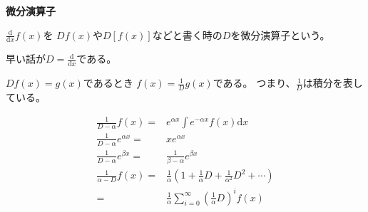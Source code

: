 \documentclass[12pt,b5paper]{ltjsarticle}
\begin{document}
\hrulefill

\textbf{微分演算子}

$\frac{\mathrm{d}}{\mathrm{d}x}f(x)$を
$Df(x)$や$D[f(x)]$などと書く時の$D$を微分演算子という。

早い話が$D = \frac{\mathrm{d}}{\mathrm{d}x}$である。

$Df(x)=g(x)$であるとき
$f(x)=\frac{1}{D}g(x)$である。
つまり、$\frac{1}{D}$は積分を表している。


\begin{align}
 \frac{1}{D-\alpha}f(x) =& e^{\alpha x}\int e^{-\alpha x}f(x)\mathrm{d}x\\
 \frac{1}{D-\alpha}e^{\alpha x} =& xe^{\alpha x}\\
 \frac{1}{D-\alpha}e^{\beta x} =& \frac{1}{\beta-\alpha}e^{\beta x}\\
 \frac{1}{\alpha-D}f(x) =& \frac{1}{\alpha}\left( 1+\frac{1}{\alpha}D+\frac{1}{\alpha^2}D^2+\cdots \right)\\
 =& \frac{1}{\alpha} \sum_{i=0}^{\infty} \left(\frac{1}{\alpha}D\right)^{i}f(x)\\
\end{align}

\hrulefill
\end{document}
